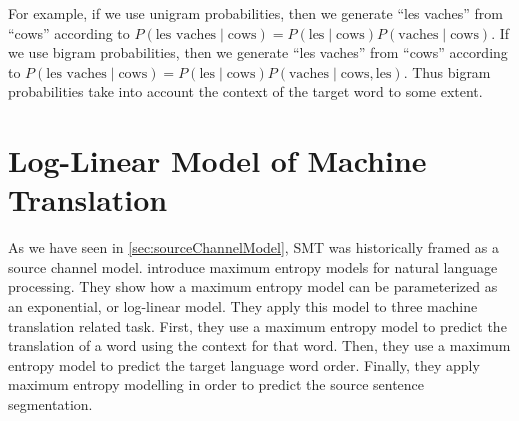 %
For example, if we use unigram probabilities, then we generate ``les vaches''
from ``cows'' according to
$P(\mbox{les vaches} \mid \mbox{cows}) = P(\mbox{les} \mid \mbox{cows}) P(\mbox{vaches} \mid \mbox{cows})$.
If we use bigram probabilities, then we generate ``les vaches'' from ``cows''
according to {\small $P(\mbox{les vaches} \mid \mbox{cows}) = P(\mbox{les} \mid \mbox{cows}) P(\mbox{vaches} \mid \mbox{cows},\mbox{les})$}.
Thus bigram probabilities take into account the context of the target word to
some extent.

\section{Log-Linear Model of Machine Translation}
\label{sec:loglinearModel}


As we have seen in \autoref{sec:sourceChannelModel}, SMT was historically
framed as a source channel model.
\cite{berger-dellapietra-dellapietra:1996:CL} introduce maximum entropy
models for natural language processing. They show how a maximum entropy
model can be parameterized as an exponential, or log-linear model. They
apply this model to three machine translation related task. First, they
use a maximum entropy model to predict the translation of a word using
the context for that word. Then, they use a maximum entropy model to
predict the target language word order. Finally, they apply maximum
entropy modelling in order to predict the source sentence segmentation.

